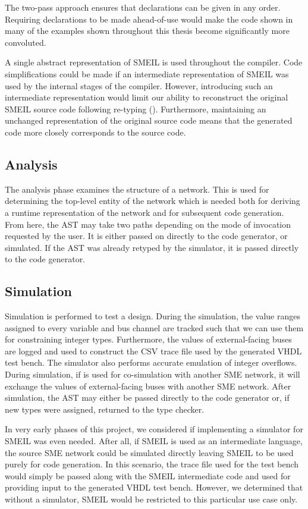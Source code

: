 The two-pass approach ensures that declarations can be given in any
order. Requiring declarations to be made ahead-of-use would make the code shown
in many of the examples shown throughout this thesis become significantly more
convoluted.

A single abstract representation of SMEIL is used throughout the compiler. Code
simplifications could be made if an intermediate representation of SMEIL was
used by the internal stages of the compiler. However, introducing such an
intermediate representation would limit our ability to reconstruct the original
SMEIL source code following re-typing (). Furthermore,
maintaining an unchanged representation of the original source code means that
the generated code more closely corresponds to the source code.

\subsection{Analysis} The analysis phase examines the structure of a network.
This is used for determining the top-level entity of the network which is needed
both for deriving a runtime representation of the network and for subsequent
code generation. From here, the AST may take two paths depending on the mode of
invocation requested by the user. It is either passed on directly to the code
generator, or simulated. If the AST was already retyped by the simulator, it is
passed directly to the code generator.

\subsection{Simulation}
Simulation is performed to test a design. During the simulation, the value
ranges assigned to every variable and bus channel are tracked such that we can
use them for constraining integer types. Furthermore, the values of
external-facing buses are logged and used to construct the CSV trace file used
by the generated VHDL test bench.
The simulator also performs accurate emulation of integer overflows. During
simulation, if \libsme{} is used for co-simulation with another SME network, it
will exchange the values of external-facing buses with another SME
network. After simulation, the AST may either be passed directly to the code
generator or, if new types were assigned, returned to the type checker.

In very early phases of this project, we considered if implementing a simulator
for SMEIL was even needed. After all, if SMEIL is used as an intermediate
language, the source SME network could be simulated directly leaving SMEIL to be
used purely for code generation. In this scenario, the trace file used for the
test bench would simply be passed along with the SMEIL intermediate code and
used for providing input to the generated VHDL test bench. However, we
determined that without a simulator, SMEIL would be restricted to this
particular use case only.

